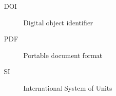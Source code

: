 \begin{description}
  \item[DOI] Digital object identifier
  \item[PDF] Portable document format
  \item[SI] International System of Units
\end{description}
